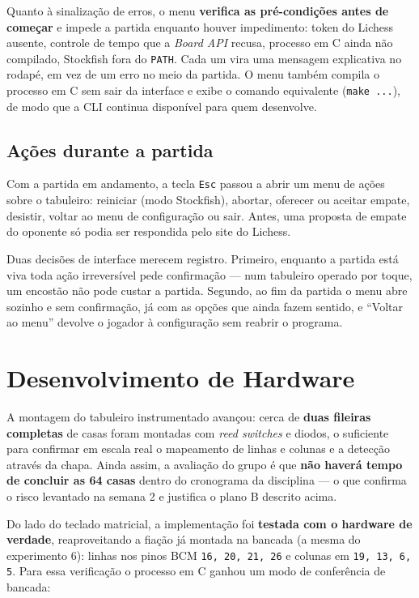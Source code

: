 \documentclass[12pt,a4paper]{article}
\begin{document}
Quanto à sinalização de erros, o menu \textbf{verifica as pré-condições antes
de começar} e impede a partida enquanto houver impedimento: token do Lichess
ausente, controle de tempo que a \emph{Board API} recusa, processo em C ainda
não compilado, Stockfish fora do \texttt{PATH}. Cada um vira uma mensagem
explicativa no rodapé, em vez de um erro no meio da partida. O menu também
compila o processo em C sem sair da interface e exibe o comando equivalente
(\texttt{make ...}), de modo que a CLI continua disponível para quem
desenvolve.

\subsection{Ações durante a partida}

Com a partida em andamento, a tecla \texttt{Esc} passou a abrir um menu de
ações sobre o tabuleiro: reiniciar (modo Stockfish), abortar, oferecer ou
aceitar empate, desistir, voltar ao menu de configuração ou sair. Antes, uma
proposta de empate do oponente só podia ser respondida pelo site do Lichess.

Duas decisões de interface merecem registro. Primeiro, enquanto a partida está
viva toda ação irreversível pede confirmação --- num tabuleiro operado por
toque, um encostão não pode custar a partida. Segundo, ao fim da partida o
menu abre sozinho e sem confirmação, já com as opções que ainda fazem sentido,
e ``Voltar ao menu'' devolve o jogador à configuração sem reabrir o programa.

\section{Desenvolvimento de Hardware}

A montagem do tabuleiro instrumentado avançou: cerca de \textbf{duas fileiras
completas} de casas foram montadas com \emph{reed switches} e diodos, o
suficiente para confirmar em escala real o mapeamento de linhas e colunas e a
detecção através da chapa. Ainda assim, a avaliação do grupo é que
\textbf{não haverá tempo de concluir as 64 casas} dentro do cronograma da
disciplina --- o que confirma o risco levantado na semana 2 e justifica o plano
B descrito acima.

Do lado do teclado matricial, a implementação foi \textbf{testada com o
hardware de verdade}, reaproveitando a fiação já montada na bancada (a mesma do
experimento 6): linhas nos pinos BCM \texttt{16, 20, 21, 26} e colunas em
\texttt{19, 13, 6, 5}. Para essa verificação o processo em C ganhou um modo de
conferência de bancada:
\end{document}
